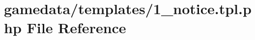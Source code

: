 \hypertarget{1__notice_8tpl_8php}{\section{gamedata/templates/1\+\_\+notice.tpl.\+php File Reference}
\label{1__notice_8tpl_8php}
}
